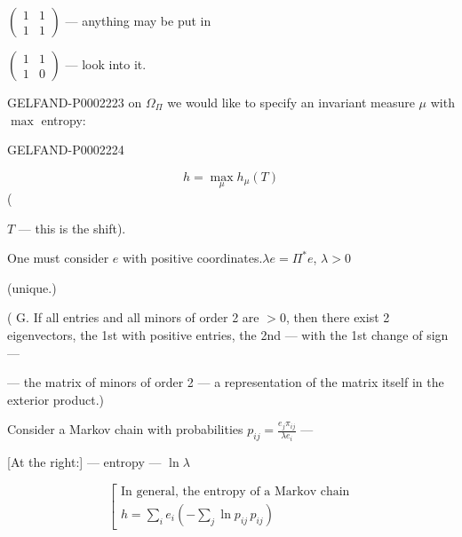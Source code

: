 $\begin{pmatrix}1&1\\1&1\end{pmatrix}$ — anything may be put in



$\begin{pmatrix}1&1\\1&0\end{pmatrix}$ — look into it.



\begin{GelfandAdjacentEvidence}{GELFAND-P000222}{3}
on $\Omega_\Pi$ we would like to specify an invariant measure $\mu$ with $\max$ entropy:



\end{GelfandAdjacentEvidence}
\begin{GelfandAdjacentEvidence}{GELFAND-P000222}{4}

\begin{equation*}
 h=\max_\mu h_\mu (T)
\end{equation*}
(
\end{GelfandAdjacentEvidence}
 $T$ — this is the shift).

One must consider $e$ with positive coordinates.\quad $\lambda e=\Pi^*e$, $\lambda>0$

(unique.)



( G. If all entries and all minors of order 2 are $>0$, then
there exist 2 eigenvectors, the 1st with positive entries, the 2nd — with
the 1st change of sign —

— the matrix of minors of order 2 — a representation of the matrix itself in the exterior product.)



Consider a Markov chain with probabilities $\displaystyle p_{ij}=\frac{e_j\pi_{ij}}{\lambda e_i}$ —

[At the right:] — entropy — $\ln\lambda$



\begin{equation*}
\left[
\begin{gathered}
\text{In general, the entropy of a Markov chain}\\
 h=\sum_i e_i\left (-\sum_j\ln p_{ij}\, p_{ij}\right)
\end{gathered}
\right.
\end{equation*}



